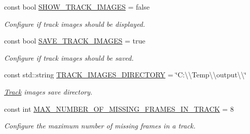 \begin{DoxyCompactItemize}
const bool \mbox{\hyperlink{namespacedto_1_1_configuration_aa353e5faa821d1815da2e972a913897e}{S\+H\+O\+W\+\_\+\+T\+R\+A\+C\+K\+\_\+\+I\+M\+A\+G\+ES}} = false
\begin{DoxyCompactList}\small\item\em Configure if track images should be displayed. \end{DoxyCompactList}\item 
\mbox{\label{namespacedto_1_1_configuration_a9b660e0e4cfdf68744079dcfb397bd54}} 
const bool \mbox{\hyperlink{namespacedto_1_1_configuration_a9b660e0e4cfdf68744079dcfb397bd54}{S\+A\+V\+E\+\_\+\+T\+R\+A\+C\+K\+\_\+\+I\+M\+A\+G\+ES}} = true
\begin{DoxyCompactList}\small\item\em Configure if track images should be saved. \end{DoxyCompactList}\item 
\mbox{\label{namespacedto_1_1_configuration_a9bdfa83dc22029a01f333d72d027b6a2}} 
const std\+::string \mbox{\hyperlink{namespacedto_1_1_configuration_a9bdfa83dc22029a01f333d72d027b6a2}{T\+R\+A\+C\+K\+\_\+\+I\+M\+A\+G\+E\+S\+\_\+\+D\+I\+R\+E\+C\+T\+O\+RY}} = \char`\"{}C\+:\textbackslash{}\textbackslash{}\+Temp\textbackslash{}\textbackslash{}output\textbackslash{}\textbackslash{}\char`\"{}
\begin{DoxyCompactList}\small\item\em \mbox{\hyperlink{structdto_1_1_track}{Track}} images save directory. \end{DoxyCompactList}\item 
\mbox{\label{namespacedto_1_1_configuration_a2b38148594df84a3e905fae0947dc5df}} 
const int \mbox{\hyperlink{namespacedto_1_1_configuration_a2b38148594df84a3e905fae0947dc5df}{M\+A\+X\+\_\+\+N\+U\+M\+B\+E\+R\+\_\+\+O\+F\+\_\+\+M\+I\+S\+S\+I\+N\+G\+\_\+\+F\+R\+A\+M\+E\+S\+\_\+\+I\+N\+\_\+\+T\+R\+A\+CK}} = 8
\begin{DoxyCompactList}\small\item\em Configure the maximum number of missing frames in a track. \end{DoxyCompactList}\item 
\mbox{\label{namespacedto_1_1_configuration_aa40d3b001a3d55b47dc009c828c709c0}} 

\end{DoxyCompactItemize}

